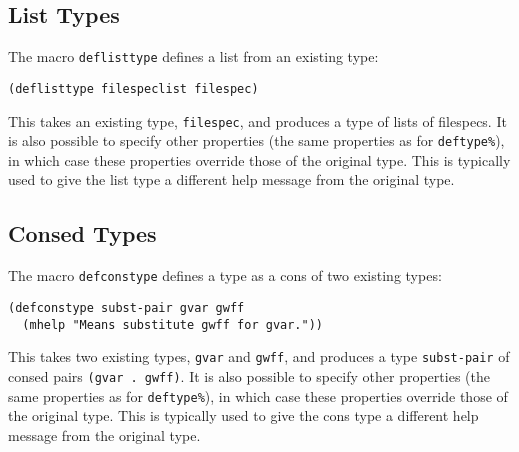 \subsection{List Types}

The macro {\tt deflisttype} defines a list from an existing type:

\begin{verbatim}
(deflisttype filespeclist filespec)
\end{verbatim}

This takes an existing type, {\tt filespec}, and produces a type of lists of filespecs.
It is also possible to specify other properties (the same properties as for {\tt deftype\%}),
in which case these properties override those of the original type. This is typically 
used to give the list type a different help message from the original type.

\subsection{Consed Types}

The macro {\tt defconstype} defines a type as a cons of two existing types:

\begin{verbatim}
(defconstype subst-pair gvar gwff
  (mhelp "Means substitute gwff for gvar."))
\end{verbatim}

This takes two existing types, {\tt gvar} and {\tt gwff}, and produces a type {\tt subst-pair} of 
consed pairs {\tt (gvar . gwff)}.
It is also possible to specify other properties (the same properties as for {\tt deftype\%}),
in which case these properties override those of the original type. This is typically 
used to give the cons type a different help message from the original type.








